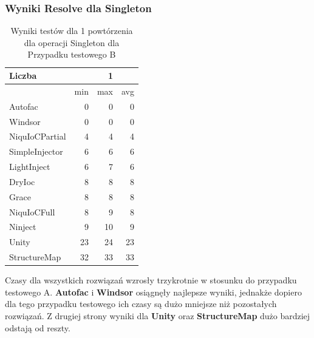 \documentclass[12pt]{article}
\begin{document}
\subsubsection{Wyniki Resolve dla Singleton}
\begin{table}[H]
\captionsetup{belowskip=0pt,aboveskip=0pt}
\begin{center}
\begin{small}
	\begin{tabular}{ | l | r r r | }
    		\hline
Liczba & & 1 & \\ \hline
 & min & max & avg \\ \hline
Autofac & 0 & 0 & 0 \\ \hline
Windsor & 0 & 0 & 0 \\ \hline
NiquIoCPartial & 4 & 4 & 4 \\ \hline
SimpleInjector & 6 & 6 & 6 \\ \hline
LightInject & 6 & 7 & 6 \\ \hline
DryIoc & 8 & 8 & 8 \\ \hline
Grace & 8 & 8 & 8 \\ \hline
NiquIoCFull & 8 & 9 & 8 \\ \hline
Ninject & 9 & 10 & 9 \\ \hline
Unity & 23 & 24 & 23 \\ \hline
StructureMap & 32 & 33 & 33 \\ \hline
  	\end{tabular}
\end{small}
\end{center}
\caption{Wyniki testów dla 1 powtórzenia dla operacji Singleton dla Przypadku testowego B}
\label{TestCaseB_Singleton1}
\end{table}
Czasy dla wszystkich rozwiązań wzrosły trzykrotnie w stosunku do przypadku testowego A. \textbf{Autofac} i \textbf{Windsor} osiągnęły najlepsze wyniki, jednakże dopiero dla tego przypadku testowego ich czasy są dużo mniejsze niż pozostałych rozwiązań. Z drugiej strony wyniki dla \textbf{Unity} oraz \textbf{StructureMap} dużo bardziej odstają od reszty.
\\ \\
\end{document}
